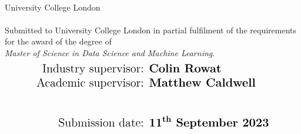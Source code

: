 \begin{singlespace}
    \begin{titlepage}
    	
    	
        \centering
		\vspace*{-3.75cm}
		 \vspace{1cm}

        { \begin{spacing}{1.35}
        \end{spacing} }
    
    	\vspace{0.5cm}        
		

        \huge \textbf{{\authorName}}\\
        {\LARGE University College London}\\
        {\LARGE \department}\\[2cm]

        {\Large Submitted to University College London in partial fulfilment of the requirements for the award of the degree of \\ \textit{Master of Science in Data Science and Machine Learning}.}\\[0.5cm]

        \begin{align*}
        	\text{\Large Industry supervisor: } & \text{\Large \textbf{Colin Rowat}} \\
        	\text{\Large Academic supervisor: } & \text{\Large \textbf{Matthew Caldwell}} \\[1cm]
        	\text{\Large Submission date: } & \text{\Large \textbf{\textbf{11\textsuperscript{th} September 2023}}}
        \end{align*}\\[2cm]
        

\end{titlepage}
\end{singlespace}
